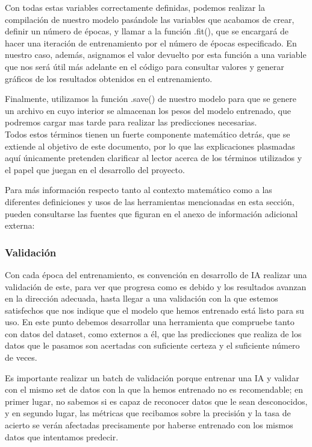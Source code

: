 \documentclass{article}
\begin{document}
Con todas estas variables correctamente definidas, podemos realizar la compilación de nuestro modelo pasándole las variables que acabamos de crear, definir un número de épocas, y llamar a la función .fit(), que se encargará de hacer una iteración de entrenamiento por el número de épocas especificado. En nuestro caso, además, asignamos el valor devuelto por esta función a una variable que nos será útil más adelante en el código para consultar valores y generar gráficos de los resultados obtenidos en el entrenamiento.

Finalmente, utilizamos la función .save() de nuestro modelo para que se genere un archivo en cuyo interior se almacenan los pesos del modelo entrenado, que podremos cargar mas tarde para realizar las predicciones necesarias.\\


Todos estos términos tienen un fuerte componente matemático detrás, que se extiende al objetivo de este documento, por lo que las explicaciones plasmadas aquí únicamente pretenden clarificar al lector acerca de los términos utilizados y el papel que juegan en el desarrollo del proyecto.

Para más información respecto tanto al contexto matemático como a las diferentes definiciones y usos de las herramientas mencionadas en esta sección, pueden consultarse las fuentes que figuran en el anexo de información adicional externa:\\


\subsubsection{Validación}
Con cada época del entrenamiento, es convención en desarrollo de IA realizar una validación de este, para ver que progresa como es debido y los resultados avanzan en la dirección adecuada, hasta llegar a una validación con la que estemos satisfechos que nos indique que el modelo que hemos entrenado está listo para su uso. En este punto debemos desarrollar una herramienta que compruebe tanto con datos del dataset, como externos a él, que las predicciones que realiza de los datos que le pasamos son acertadas con suficiente certeza y el suficiente número de veces.

Es importante realizar un batch de validación porque entrenar una IA y validar con el mismo set de datos con la que la hemos entrenado no es recomendable; en primer lugar, no sabemos si es capaz de reconocer datos que le sean desconocidos, y en segundo lugar, las métricas que recibamos sobre la precisión y la tasa de acierto se verán afectadas precisamente por haberse entrenado con los mismos datos que intentamos predecir.
\end{document}
